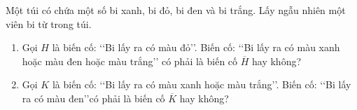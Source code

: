\begin{bt}%
	Một túi có chứa một số bi xanh, bi đỏ, bi đen và bi trắng. Lấy ngẫu nhiên 
	một viên bi từ trong túi. 
	\begin{enumerate}
		\item Gọi $ H $ là biến cố: \lq \lq Bi lấy ra có màu đỏ\rq \rq. Biến 
		cố: \lq \lq Bi lấy ra có màu xanh hoặc màu đen hoặc màu trắng\rq \rq  
		có phải là biến cố $ \overline{H} $ hay không? 
		\item Gọi $ K $ là biến cố: \lq \lq Bi lấy ra có màu xanh hoặc màu 
		trắng\rq \rq. 
		Biến cố: \lq \lq Bi lấy ra có màu đen\rq \rq  có phải là biến cố $ 
		\overline{K} $ hay 
		không?
	\end{enumerate}
	
\end{bt}

